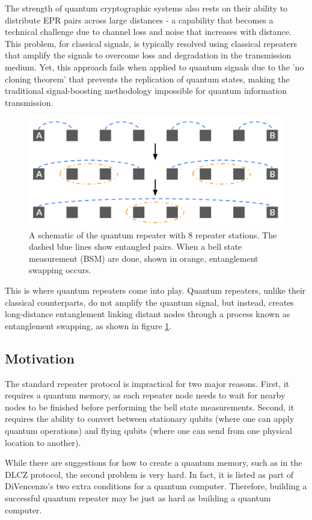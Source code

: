 \documentclass[%
 reprint,
 amsmath,amssymb
 aps,
]{revtex4}
\theoremstyle{remark}
\begin{document}
The strength of quantum cryptographic systems also rests on their ability to distribute EPR pairs across large distances - a capability that becomes a technical challenge due to channel loss and noise that increases with distance. This problem, for classical signals, is typically resolved using classical repeaters that amplify the signals to overcome loss and degradation in the transmission medium. Yet, this approach fails when applied to quantum signals due to the 'no cloning theorem' that prevents the replication of quantum states, making the traditional signal-boosting methodology impossible for quantum information transmission.
\begin{figure}[H]
    \centering
    \includegraphics[width=0.7\linewidth]{figs/quantum-repeater.png}
    \caption{A schematic of the quantum repeater with $8$ repeater stations. The dashed blue lines show entangled pairs. When a bell state measurement (BSM) are done, shown in orange, entanglement swapping occurs.}
    \label{fig:QR}
\end{figure}

This is where quantum repeaters come into play. Quantum repeaters, unlike their classical counterparts, do not amplify the quantum signal, but instead, creates long-distance entanglement linking distant nodes through a process known as entanglement swapping, as shown in figure \ref{fig:QR}.
\subsection{Motivation}
The standard repeater protocol is impractical for two major reasons. First, it requires a quantum memory, as each repeater node needs to wait for nearby nodes to be finished before performing the bell state measurements. Second, it requires the ability to convert between stationary qubits (where one can apply quantum operations) and flying qubits (where one can send from one physical location to another).
\vspace{2mm}

While there are suggestions for how to create a quantum memory, such as in the DLCZ protocol, the second problem is very hard. In fact, it is listed as part of DiVencenzo's two extra conditions for a quantum computer. Therefore, building a successful quantum repeater may be just as hard as building a quantum computer. 
\vspace{2mm}
\end{document}
